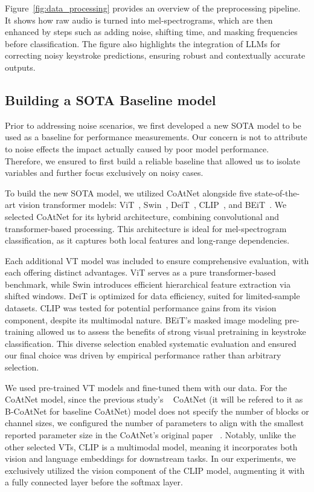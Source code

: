 Figure~\ref{fig:data_processing} provides an overview of the preprocessing pipeline. It shows how raw audio is turned into mel-spectrograms, which are then enhanced by steps such as adding noise, shifting time, and masking frequencies before classification. The figure also highlights the integration of LLMs for correcting noisy keystroke predictions, ensuring robust and contextually accurate outputs.

\subsection{Building a SOTA Baseline model}

Prior to addressing noise scenarios, we first developed a new SOTA model to be used as a baseline for performance measurements. Our concern is not to attribute to noise effects the impact actually caused by poor model performance. Therefore, we ensured to first build a reliable baseline that allowed us to isolate variables and further focus exclusively on noisy cases.

To build the new SOTA model, we utilized CoAtNet alongside five state-of-the-art vision transformer models: ViT~\cite{dosovitskiy2020image}, Swin~\cite{liu2021swin}, DeiT~\cite{touvron2021training}, CLIP~\cite{radford2021learning}, and BEiT~\cite{bao2021beit}. We selected CoAtNet for its hybrid architecture, combining convolutional and transformer-based processing. This architecture is ideal for mel-spectrogram classification, as it captures both local features and long-range dependencies.

Each additional VT model was included to ensure comprehensive evaluation, with each offering distinct advantages. ViT serves as a pure transformer-based benchmark, while Swin introduces efficient hierarchical feature extraction via shifted windows. DeiT is optimized for data efficiency, suited for limited-sample datasets. CLIP was tested for potential performance gains from its vision component, despite its multimodal nature. BEiT's masked image modeling pre-training allowed us to assess the benefits of strong visual pretraining in keystroke classification. This diverse selection enabled systematic evaluation and ensured our final choice was driven by empirical performance rather than arbitrary selection.

We used pre-trained VT models and fine-tuned them with our data. For the CoAtNet model, since the previous study's ~\cite{harrison2023practical} CoAtNet (it will be refered to it as B-CoAtNet for baseline CoAtNet) model does not specify the number of blocks or channel sizes, we configured the number of parameters to align with the smallest reported parameter size in the CoAtNet's original paper ~\cite{dai2021coatnet}. Notably, unlike the other selected VTs, CLIP is a multimodal model, meaning it incorporates both vision and language embeddings for downstream tasks. In our experiments, we exclusively utilized the vision component of the CLIP model, augmenting it with a fully connected layer before the softmax layer. 

